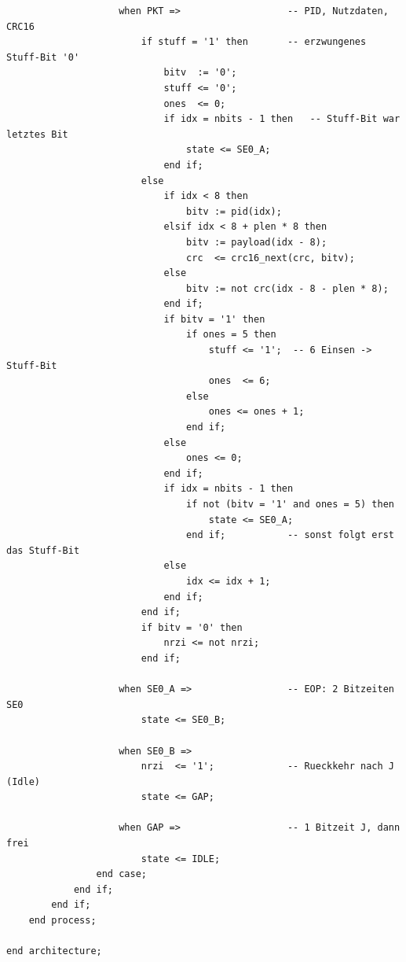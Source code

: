\documentclass[a4paper,11pt]{article}
\begin{document}
\begin{verbatim}
                    when PKT =>                   -- PID, Nutzdaten, CRC16
                        if stuff = '1' then       -- erzwungenes Stuff-Bit '0'
                            bitv  := '0';
                            stuff <= '0';
                            ones  <= 0;
                            if idx = nbits - 1 then   -- Stuff-Bit war letztes Bit
                                state <= SE0_A;
                            end if;
                        else
                            if idx < 8 then
                                bitv := pid(idx);
                            elsif idx < 8 + plen * 8 then
                                bitv := payload(idx - 8);
                                crc  <= crc16_next(crc, bitv);
                            else
                                bitv := not crc(idx - 8 - plen * 8);
                            end if;
                            if bitv = '1' then
                                if ones = 5 then
                                    stuff <= '1';  -- 6 Einsen -> Stuff-Bit
                                    ones  <= 6;
                                else
                                    ones <= ones + 1;
                                end if;
                            else
                                ones <= 0;
                            end if;
                            if idx = nbits - 1 then
                                if not (bitv = '1' and ones = 5) then
                                    state <= SE0_A;
                                end if;           -- sonst folgt erst das Stuff-Bit
                            else
                                idx <= idx + 1;
                            end if;
                        end if;
                        if bitv = '0' then
                            nrzi <= not nrzi;
                        end if;

                    when SE0_A =>                 -- EOP: 2 Bitzeiten SE0
                        state <= SE0_B;

                    when SE0_B =>
                        nrzi  <= '1';             -- Rueckkehr nach J (Idle)
                        state <= GAP;

                    when GAP =>                   -- 1 Bitzeit J, dann frei
                        state <= IDLE;
                end case;
            end if;
        end if;
    end process;

end architecture;
\end{verbatim}
\end{document}
